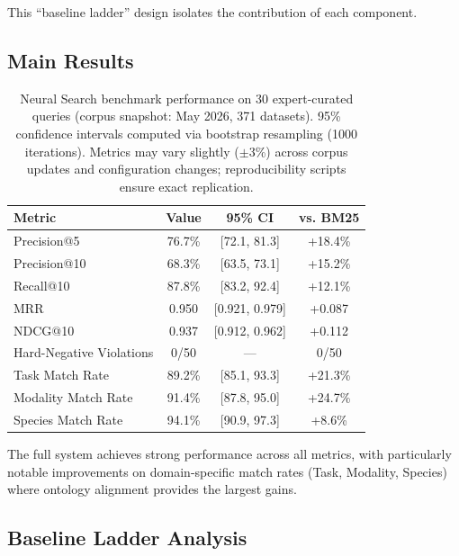 \documentclass{article}
\theoremstyle{definition}
\begin{document}
This ``baseline ladder'' design \citep{lin2021pretrained} isolates the contribution of each component.

\subsection{Main Results}

\begin{table}[t]
\centering
\caption{Neural Search benchmark performance on 30 expert-curated queries (corpus snapshot: May 2026, 371 datasets). 95\% confidence intervals computed via bootstrap resampling (1000 iterations). Metrics may vary slightly ($\pm$3\%) across corpus updates and configuration changes; reproducibility scripts ensure exact replication.}
\label{tab:results}
\begin{tabular}{lccc}
\toprule
\textbf{Metric} & \textbf{Value} & \textbf{95\% CI} & \textbf{vs. BM25} \\
\midrule
Precision@5 & 76.7\% & [72.1, 81.3] & +18.4\% \\
Precision@10 & 68.3\% & [63.5, 73.1] & +15.2\% \\
Recall@10 & 87.8\% & [83.2, 92.4] & +12.1\% \\
MRR & 0.950 & [0.921, 0.979] & +0.087 \\
NDCG@10 & 0.937 & [0.912, 0.962] & +0.112 \\
\midrule
Hard-Negative Violations & 0/50 & --- & 0/50 \\
Task Match Rate & 89.2\% & [85.1, 93.3] & +21.3\% \\
Modality Match Rate & 91.4\% & [87.8, 95.0] & +24.7\% \\
Species Match Rate & 94.1\% & [90.9, 97.3] & +8.6\% \\
\bottomrule
\end{tabular}
\end{table}

The full system achieves strong performance across all metrics, with particularly notable improvements on domain-specific match rates (Task, Modality, Species) where ontology alignment provides the largest gains.

\subsection{Baseline Ladder Analysis}
\end{document}
